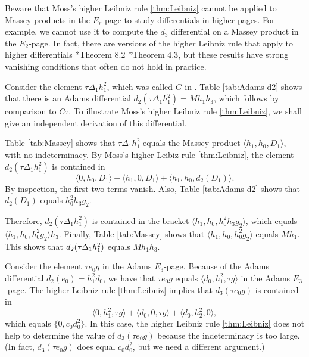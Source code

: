 \begin{remark}
Beware that Moss's higher Leibniz rule \ref{thm:Leibniz}
cannot be applied
to Massey products in the $E_r$-page to study differentials in
higher pages.  For example, we cannot use it 
to compute the $d_3$ differential on a Massey product in the $E_2$-page.
In fact, there are versions of the higher Leibniz rule that
apply to higher differentials \cite{Kochman78}*{Theorem 8.2} 
\cite{May69}*{Theorem 4.3}, 
but these results have strong
vanishing conditions that often do not hold in practice.
\end{remark}

\begin{ex}
\label{ex:Leibniz-tD1h1^2}
Consider the element $\tau \Delta_1 h_1^2$, which 
was called $G$ in \cite{Tangora70a}.
Table \ref{tab:Adams-d2} shows that there is an Adams
differential $d_2(\tau \Delta_1 h_1^2) = M h_1 h_3$, which follows
by comparison to $C\tau$.  To illustrate Moss's higher Leibniz
rule \ref{thm:Leibniz}, we shall give an independent derivation
of this differential.

Table \ref{tab:Massey} shows that $\tau \Delta_1 h_1^2$ equals
the Massey product $\langle h_1, h_0, D_1 \rangle$,
with no indeterminacy.
By Moss's higher Leibiz rule \ref{thm:Leibniz}, the element
$d_2(\tau \Delta_1 h_1^2)$ is contained in
\[
\langle 0, h_0, D_1 \rangle + \langle h_1, 0, D_1 \rangle + \langle h_1, h_0, d_2(D_1) \rangle.
\]
By inspection, the first two terms vanish.  Also, Table \ref{tab:Adams-d2}
shows that $d_2(D_1)$ equals $h_0^2 h_3 g_2$.

Therefore,
$d_2(\tau \Delta_1 h_1^2)$ is contained in the bracket
$\langle h_1, h_0, h_0^2 h_3 g_2 \rangle$, which equals
$\langle h_1, h_0, h_0^2 g_2 \rangle h_3$.
Finally, Table \ref{tab:Massey} shows that
$\langle h_1, h_0, h_0^2 g_2 \rangle$ equals $M h_1$.
This shows that 
$d_2(\tau \Delta_1 h_1^2)$ equals $M h_1 h_3$.	
\end{ex}



\begin{ex}
Consider the element  $\tau e_0 g$ in the Adams $E_3$-page.
Because of the Adams differential $d_2(e_0) = h_1^2 d_0$, we have that
$\tau e_0 g$ equals $\langle d_0, h_1^2, \tau g \rangle$ 
in the Adams $E_3$-page.
The higher Leibniz rule \ref{thm:Leibniz} implies that 
$d_3(\tau e_0 g)$ is contained in
\[
\langle 0, h_1^2, \tau g \rangle + \langle d_0, 0, \tau g \rangle +
\langle d_0, h_2^2, 0 \rangle,
\]
which equals $\{0, c_0 d_0^2 \}$.
In this case, 
the higher Leibniz rule \ref{thm:Leibniz} does not help to determine
the value of $d_3(\tau e_0 g)$ because the indeterminacy is too large.
(In fact, $d_3(\tau e_0 g)$ does equal $c_0 d_0^2$, but we need a 
different argument.)
\end{ex}

